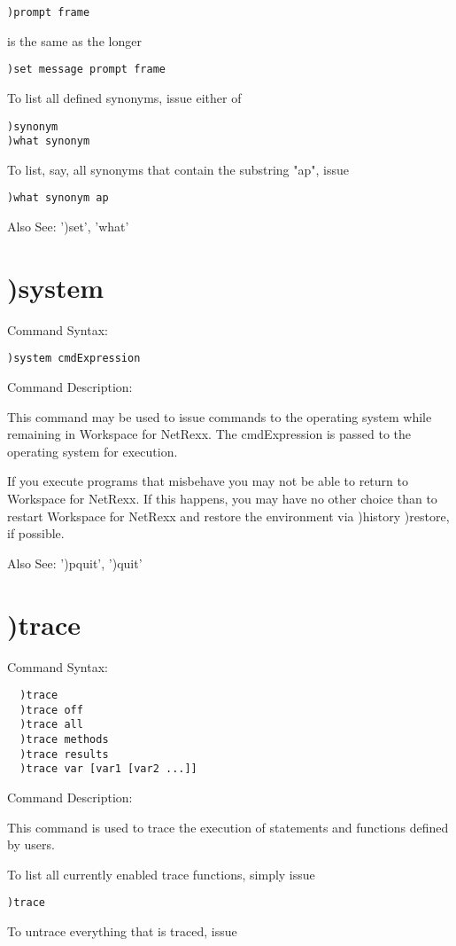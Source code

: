 \begin{verbatim}
)prompt frame
\end{verbatim}
is the same as the longer

\begin{verbatim}
)set message prompt frame
\end{verbatim}
To list all defined synonyms, issue either of

\begin{verbatim}
)synonym
)what synonym
\end{verbatim}
To list, say, all synonyms that contain the substring "ap", issue

\begin{verbatim}
)what synonym ap
\end{verbatim}
Also See: ')set', 'what'

\section{)system}

Command Syntax:
\begin{verbatim}
)system cmdExpression
\end{verbatim}
Command Description:

This command may be used to issue commands to the operating system while remaining in Workspace for NetRexx. The cmdExpression is passed to the operating system for execution.

If you execute programs that misbehave you may not be able to return to Workspace for NetRexx. If this happens, you may have no other choice than to restart Workspace for NetRexx and restore the environment via )history )restore, if possible.

Also See: ')pquit', ')quit'

\section{)trace}

Command Syntax:
\begin{verbatim}
  )trace
  )trace off
  )trace all
  )trace methods
  )trace results
  )trace var [var1 [var2 ...]]
\end{verbatim}
Command Description:

This command is used to trace the execution of statements and functions defined by users.

To list all currently enabled trace functions, simply issue
\begin{verbatim}
)trace
\end{verbatim}
To untrace everything that is traced, issue

